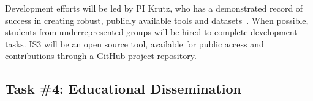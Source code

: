 \documentclass[11pt]{proposalnsf}
\newcommand{\dan}[1]{\textcolor{blue}{{\it [Dan says: #1]}}}
\newlength\q %
\begin{document}
\begin{sloppypar}





















\newpage %
Development efforts will be led by PI Krutz, who has a demonstrated record of success in creating robust, publicly available tools and datasets~\cite{krutz2013cccd, krutz2014code, krutz2015dataset, Dennis:2017:PPS:3104086.3104136, Chester:2017:MLD:3104086.3104135, McAfee:2017:CCA:3104086.3104132}. When possible, students from underrepresented groups will be hired to complete development tasks. IS3 will be an open source tool, available for public access and contributions through a GitHub project repository.


\subsection*{Task \#4: Educational Dissemination}


\end{sloppypar}
\end{document}
